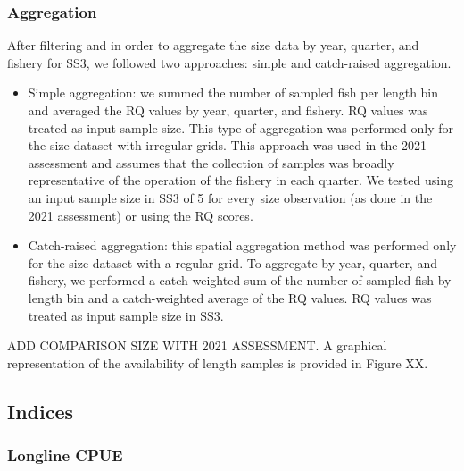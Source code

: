\documentclass[
]{scrartcl}
\begin{document}
\subsubsection{Aggregation}\label{aggregation-1}

After filtering and in order to aggregate the size data by year,
quarter, and fishery for SS3, we followed two approaches: simple and
catch-raised aggregation.

\begin{itemize}
\item
  Simple aggregation: we summed the number of sampled fish per length
  bin and averaged the RQ values by year, quarter, and fishery. RQ
  values was treated as input sample size. This type of aggregation was
  performed only for the size dataset with irregular grids. This
  approach was used in the 2021 assessment and assumes that the
  collection of samples was broadly representative of the operation of
  the fishery in each quarter. We tested using an input sample size in
  SS3 of 5 for every size observation (as done in the 2021 assessment)
  or using the RQ scores.
\item
  Catch-raised aggregation: this spatial aggregation method was
  performed only for the size dataset with a regular grid. To aggregate
  by year, quarter, and fishery, we performed a catch-weighted sum of
  the number of sampled fish by length bin and a catch-weighted average
  of the RQ values. RQ values was treated as input sample size in SS3.
\end{itemize}

ADD COMPARISON SIZE WITH 2021 ASSESSMENT. A graphical representation of
the availability of length samples is provided in Figure XX.

\subsection{Indices}\label{indices}

\subsubsection{Longline CPUE}\label{longline-cpue}
\end{document}
